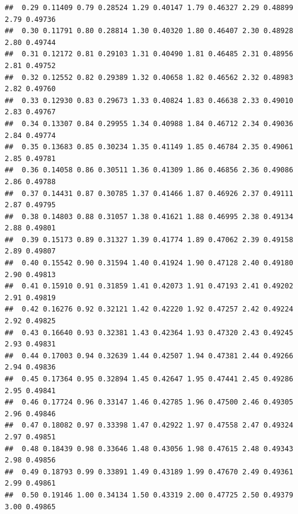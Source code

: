 \documentclass[onecolumn,12pt]{book}\usepackage[]{graphicx}\usepackage[]{color}
\makeatletter
\newenvironment{kframe}{%
 \def\at@end@of@kframe{}%
 \ifinner\ifhmode%
  \def\at@end@of@kframe{\end{minipage}}%
  \begin{minipage}{\columnwidth}%
 \fi\fi%
 \def\FrameCommand##1{\hskip\@totalleftmargin \hskip-\fboxsep
 \colorbox{shadecolor}{##1}\hskip-\fboxsep
     \hskip-\linewidth \hskip-\@totalleftmargin \hskip\columnwidth}%
 \MakeFramed {\advance\hsize-\width
   \@totalleftmargin\z@ \linewidth\hsize
   \@setminipage}}%
 {\par\unskip\endMakeFramed%
 \at@end@of@kframe}
\newenvironment{knitrout}{}{} %
\makeatother
\begin{document}
\begin{knitrout}
\begin{kframe}
\begin{verbatim}
##  0.29 0.11409 0.79 0.28524 1.29 0.40147 1.79 0.46327 2.29 0.48899 2.79 0.49736
##  0.30 0.11791 0.80 0.28814 1.30 0.40320 1.80 0.46407 2.30 0.48928 2.80 0.49744
##  0.31 0.12172 0.81 0.29103 1.31 0.40490 1.81 0.46485 2.31 0.48956 2.81 0.49752
##  0.32 0.12552 0.82 0.29389 1.32 0.40658 1.82 0.46562 2.32 0.48983 2.82 0.49760
##  0.33 0.12930 0.83 0.29673 1.33 0.40824 1.83 0.46638 2.33 0.49010 2.83 0.49767
##  0.34 0.13307 0.84 0.29955 1.34 0.40988 1.84 0.46712 2.34 0.49036 2.84 0.49774
##  0.35 0.13683 0.85 0.30234 1.35 0.41149 1.85 0.46784 2.35 0.49061 2.85 0.49781
##  0.36 0.14058 0.86 0.30511 1.36 0.41309 1.86 0.46856 2.36 0.49086 2.86 0.49788
##  0.37 0.14431 0.87 0.30785 1.37 0.41466 1.87 0.46926 2.37 0.49111 2.87 0.49795
##  0.38 0.14803 0.88 0.31057 1.38 0.41621 1.88 0.46995 2.38 0.49134 2.88 0.49801
##  0.39 0.15173 0.89 0.31327 1.39 0.41774 1.89 0.47062 2.39 0.49158 2.89 0.49807
##  0.40 0.15542 0.90 0.31594 1.40 0.41924 1.90 0.47128 2.40 0.49180 2.90 0.49813
##  0.41 0.15910 0.91 0.31859 1.41 0.42073 1.91 0.47193 2.41 0.49202 2.91 0.49819
##  0.42 0.16276 0.92 0.32121 1.42 0.42220 1.92 0.47257 2.42 0.49224 2.92 0.49825
##  0.43 0.16640 0.93 0.32381 1.43 0.42364 1.93 0.47320 2.43 0.49245 2.93 0.49831
##  0.44 0.17003 0.94 0.32639 1.44 0.42507 1.94 0.47381 2.44 0.49266 2.94 0.49836
##  0.45 0.17364 0.95 0.32894 1.45 0.42647 1.95 0.47441 2.45 0.49286 2.95 0.49841
##  0.46 0.17724 0.96 0.33147 1.46 0.42785 1.96 0.47500 2.46 0.49305 2.96 0.49846
##  0.47 0.18082 0.97 0.33398 1.47 0.42922 1.97 0.47558 2.47 0.49324 2.97 0.49851
##  0.48 0.18439 0.98 0.33646 1.48 0.43056 1.98 0.47615 2.48 0.49343 2.98 0.49856
##  0.49 0.18793 0.99 0.33891 1.49 0.43189 1.99 0.47670 2.49 0.49361 2.99 0.49861
##  0.50 0.19146 1.00 0.34134 1.50 0.43319 2.00 0.47725 2.50 0.49379 3.00 0.49865
\end{verbatim}
\end{kframe}
\end{knitrout}
\vfill\eject
\end{document}
